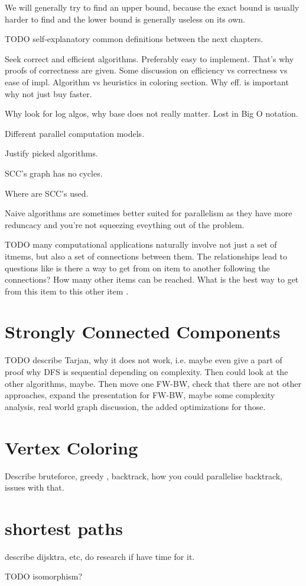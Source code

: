 \documentclass{report}
\theoremstyle{plain}
\theoremstyle{definition}
\theoremstyle{remark}
\numberwithin{definition}{chapter}
\numberwithin{example}{chapter}
\numberwithin{figure}{chapter}
\begin{document}
We will generally try to find an upper bound, because the exact bound is usually harder to find and the lower bound is generally useless on its own.

TODO self-explanatory common definitions between the next chapters.

Seek correct and efficient algorithms. Preferably easy to implement. That's why proofs of correctness are given.
Some discussion on efficiency vs correctness vs ease of impl.
Algorithm vs heuristics in coloring section.
Why eff. is important why not just buy faster.

Why look for log algos, why base does not really matter. Lost in Big O notation.

Different parallel computation models.

Justify picked algorithms.

SCC's graph has no cycles.

Where are SCC's used.

Naive algorithms are sometimes better suited for parallelism as they have more reduncacy and you're not squeezing eveything out of the problem.

TODO many computational applications naturally involve not just a set of itmems, but also a set of connections between them. The relationships lead to questions like is there a way to get from on item to another following the connections? How many other items can be reached. What is the best way to get from this item to this other item \cite{c++_sedgewick}. 

\chapter{Strongly Connected Components}

TODO describe Tarjan, why it does not work, i.e. maybe even give a part of proof why DFS is sequential depending on complexity. Then could look at the other algorithms, maybe. Then move one FW-BW, check that there are not other approaches, expand the presentation for FW-BW, maybe some complexity analysis, real world graph discussion, the added optimizations for those.

\chapter{Vertex Coloring}

Describe bruteforce, greedy , backtrack, how you could parallelise backtrack, issues with that.

\chapter{shortest paths}

describe dijsktra, etc, do research if have time for it.


TODO isomorphism?



\end{document}
